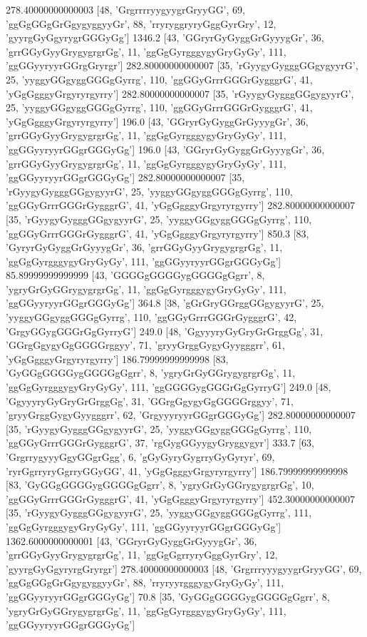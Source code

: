 278.40000000000003 [48, 'GrgrrrryygyygrGryyGG', 69, 'ggGgGGgGrGgygyggyyGr', 88, 'rryryggryryGggGyrGry', 12, 'gyyrgGyGgyrygrGGGyGg']
1346.2 [43, 'GGryrGyGyggGrGyyygGr', 36, 'grrGGyGyyGrygygrgrGg', 11, 'ggGgGyrgggygyGryGyGy', 111, 'ggGGyyryyrGGrgGryrgr']
282.80000000000007 [35, 'rGyygyGygggGGgygyyrG', 25, 'yyggyGGgyggGGGgGyrrg', 110, 'ggGGyGrrrGGGrGygggrG', 41, 'yGgGgggyGrgyryrgyrry']
282.80000000000007 [35, 'rGyygyGygggGGgygyyrG', 25, 'yyggyGGgyggGGGgGyrrg', 110, 'ggGGyGrrrGGGrGygggrG', 41, 'yGgGgggyGrgyryrgyrry']
196.0 [43, 'GGryrGyGyggGrGyyygGr', 36, 'grrGGyGyyGrygygrgrGg', 11, 'ggGgGyrgggygyGryGyGy', 111, 'ggGGyyryyrGGgrGGGyGg']
196.0 [43, 'GGryrGyGyggGrGyyygGr', 36, 'grrGGyGyyGrygygrgrGg', 11, 'ggGgGyrgggygyGryGyGy', 111, 'ggGGyyryyrGGgrGGGyGg']
282.80000000000007 [35, 'rGyygyGygggGGgygyyrG', 25, 'yyggyGGgyggGGGgGyrrg', 110, 'ggGGyGrrrGGGrGygggrG', 41, 'yGgGgggyGrgyryrgyrry']
282.80000000000007 [35, 'rGyygyGygggGGgygyyrG', 25, 'yyggyGGgyggGGGgGyrrg', 110, 'ggGGyGrrrGGGrGygggrG', 41, 'yGgGgggyGrgyryrgyrry']
850.3 [83, 'GyryrGyGyggGrGyyygGr', 36, 'grrGGyGyyGrygygrgrGg', 11, 'ggGgGyrgggygyGryGyGy', 111, 'ggGGyyryyrGGgrGGGyGg']
85.89999999999999 [43, 'GGGGgGGGGygGGGGgGgrr', 8, 'ygryGrGyGGrygygrgrGg', 11, 'ggGgGyrgggygyGryGyGy', 111, 'ggGGyyryyrGGgrGGGyGg']
364.8 [38, 'gGrGryGGrggGGgygyyrG', 25, 'yyggyGGgyggGGGgGyrrg', 110, 'ggGGyGrrrGGGrGygggrG', 42, 'GrgyGGygGGGrGgGyrryG']
249.0 [48, 'GgyyyryGyGryGrGrggGg', 31, 'GGrgGgygyGgGGGGrggyy', 71, 'gryyGrggGygyGyygggrr', 61, 'yGgGgggyGrgyryrgyrry']
186.79999999999998 [83, 'GyGGgGGGGygGGGGgGgrr', 8, 'ygryGrGyGGrygygrgrGg', 11, 'ggGgGyrgggygyGryGyGy', 111, 'ggGGGGygGGGrGgGyrryG']
249.0 [48, 'GgyyyryGyGryGrGrggGg', 31, 'GGrgGgygyGgGGGGrggyy', 71, 'gryyGrggGygyGyygggrr', 62, 'GrgyyyryyrGGgrGGGyGg']
282.80000000000007 [35, 'rGyygyGygggGGgygyyrG', 25, 'yyggyGGgyggGGGgGyrrg', 110, 'ggGGyGrrrGGGrGygggrG', 37, 'rgGygGGyygyGryggygyr']
333.7 [63, 'GrgrrygyyyGgyGGgrGgg', 6, 'gGyGyryGygrryGyGyryr', 69, 'ryrGgrryryGgrryGGyGG', 41, 'yGgGgggyGrgyryrgyrry']
186.79999999999998 [83, 'GyGGgGGGGygGGGGgGgrr', 8, 'ygryGrGyGGrygygrgrGg', 10, 'ggGGyGrrrGGGrGygggrG', 41, 'yGgGgggyGrgyryrgyrry']
452.30000000000007 [35, 'rGyygyGygggGGgygyyrG', 25, 'yyggyGGgyggGGGgGyrrg', 111, 'ggGgGyrgggygyGryGyGy', 111, 'ggGGyyryyrGGgrGGGyGg']
1362.6000000000001 [43, 'GGryrGyGyggGrGyyygGr', 36, 'grrGGyGyyGrygygrgrGg', 11, 'ggGgGgrryryGggGyrGry', 12, 'gyyrgGyGgyryrgGryrgr']
278.40000000000003 [48, 'GrgrrryyygyygrGryyGG', 69, 'ggGgGGgGrGgygyggyyGr', 88, 'rryryyrgggygyGryGyGy', 111, 'ggGGyyryyrGGgrGGGyGg']
70.8 [35, 'GyGGgGGGGygGGGGgGgrr', 8, 'ygryGrGyGGrygygrgrGg', 11, 'ggGgGyrgggygyGryGyGy', 111, 'ggGGyyryyrGGgrGGGyGg']
